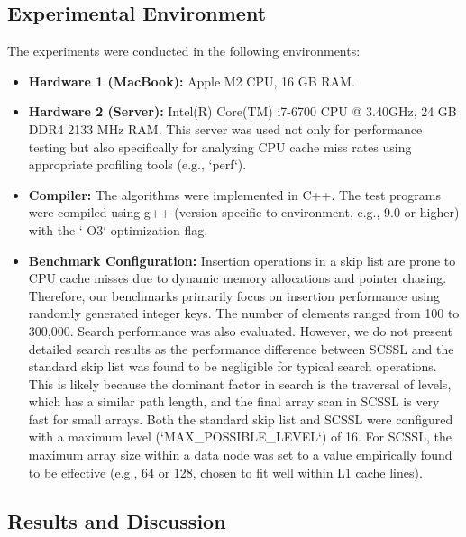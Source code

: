 \documentclass[sigconf]{acmart}
\begin{document}
\subsection{Experimental Environment}
The experiments were conducted in the following environments:
\begin{itemize}
    \item \textbf{Hardware 1 (MacBook):} Apple M2 CPU, 16 GB RAM.
    \item \textbf{Hardware 2 (Server):} Intel(R) Core(TM) i7-6700 CPU @ 3.40GHz, 24 GB DDR4 2133 MHz RAM. This server was used not only for performance testing but also specifically for analyzing CPU cache miss rates using appropriate profiling tools (e.g., `perf`).
    \item \textbf{Compiler:} The algorithms were implemented in C++. The test programs were compiled using g++ (version specific to environment, e.g., 9.0 or higher) with the `-O3` optimization flag.
    \item \textbf{Benchmark Configuration:}
        Insertion operations in a skip list are prone to CPU cache misses due to dynamic memory allocations and pointer chasing. Therefore, our benchmarks primarily focus on insertion performance using randomly generated integer keys. The number of elements ranged from 100 to 300,000.
        Search performance was also evaluated. However, we do not present detailed search results as the performance difference between SCSSL and the standard skip list was found to be negligible for typical search operations. This is likely because the dominant factor in search is the traversal of levels, which has a similar path length, and the final array scan in SCSSL is very fast for small arrays.
        Both the standard skip list and SCSSL were configured with a maximum level (`MAX_POSSIBLE_LEVEL`) of 16. For SCSSL, the maximum array size within a data node was set to a value empirically found to be effective (e.g., 64 or 128, chosen to fit well within L1 cache lines).
\end{itemize}

\subsection{Results and Discussion}
\end{document}
